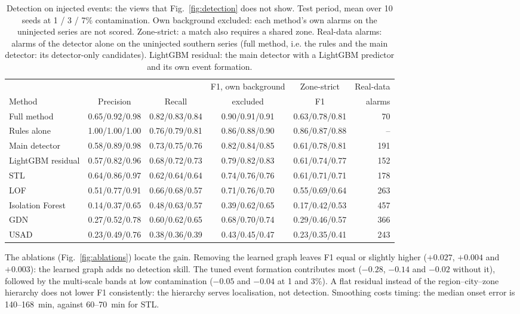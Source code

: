 \begin{table}[htbp]
\centering
\caption{Detection on injected events: the views that Fig.~\ref{fig:detection} does not show. Test period, mean over 10 seeds at 1 / 3 / 7\% contamination. Own background excluded: each method's own alarms on the uninjected series are not scored. Zone-strict: a match also requires a shared zone. Real-data alarms: alarms of the detector alone on the uninjected southern series (full method, i.e. the rules and the main detector: its detector-only candidates). LightGBM residual: the main detector with a LightGBM predictor and its own event formation.}
\label{tab:detection}
\scriptsize
\setlength{\tabcolsep}{3.5pt}
\begin{tabular}{@{}l c c c c r@{}}
\toprule
& & & F1, own background & Zone-strict & Real-data \\
Method & Precision & Recall & excluded & F1 & alarms \\
\midrule
Full method & 0.65/0.92/0.98 & 0.82/0.83/0.84 & 0.90/0.91/0.91 & 0.63/0.78/0.81 & 70 \\
Rules alone & 1.00/1.00/1.00 & 0.76/0.79/0.81 & 0.86/0.88/0.90 & 0.86/0.87/0.88 & -- \\
\midrule
Main detector & 0.58/0.89/0.98 & 0.73/0.75/0.76 & 0.82/0.84/0.85 & 0.61/0.78/0.81 & 191 \\
LightGBM residual & 0.57/0.82/0.96 & 0.68/0.72/0.73 & 0.79/0.82/0.83 & 0.61/0.74/0.77 & 152 \\
\midrule
STL & 0.64/0.86/0.97 & 0.62/0.64/0.64 & 0.74/0.76/0.76 & 0.61/0.71/0.71 & 178 \\
LOF & 0.51/0.77/0.91 & 0.66/0.68/0.57 & 0.71/0.76/0.70 & 0.55/0.69/0.64 & 263 \\
Isolation Forest & 0.14/0.37/0.65 & 0.48/0.63/0.57 & 0.39/0.62/0.65 & 0.17/0.42/0.53 & 457 \\
GDN & 0.27/0.52/0.78 & 0.60/0.62/0.65 & 0.68/0.70/0.74 & 0.29/0.46/0.57 & 366 \\
USAD & 0.23/0.49/0.76 & 0.38/0.36/0.39 & 0.43/0.45/0.47 & 0.23/0.35/0.41 & 243 \\
\bottomrule
\end{tabular}
\end{table}

The ablations (Fig.~\ref{fig:ablations}) locate the gain. Removing the learned graph leaves F1 equal or slightly higher ($+0.027$, $+0.004$ and $+0.003$): the learned graph adds no detection skill. The tuned event formation contributes most ($-0.28$, $-0.14$ and $-0.02$ without it), followed by the multi-scale bands at low contamination ($-0.05$ and $-0.04$ at 1 and 3\%). A flat residual instead of the region--city--zone hierarchy does not lower F1 consistently: the hierarchy serves localisation, not detection. Smoothing costs timing: the median onset error is 140--168~min, against 60--70~min for STL.

